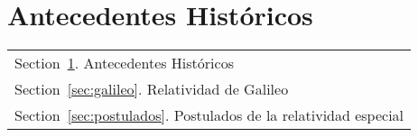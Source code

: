 \documentclass[../main]{subfiles}
\begin{document}
\section{Antecedentes Históricos}\label{sec:antecedentes}
        \begin{margintable}\vspace{.8in}\footnotesize
		\begin{tabularx}{\marginparwidth}{|X}
		Section~\ref{sec:antecedentes}. Antecedentes Históricos\\
        Section~\ref{sec:galileo}. Relatividad de Galileo\\
        Section~\ref{sec:postulados}. Postulados de la relatividad especial
		\end{tabularx}
	\end{margintable}
 
        \lipsum[1]
        
\end{document}
